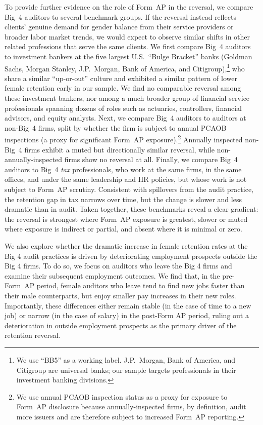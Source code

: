 \documentclass[11pt]{article}
\begin{document}
    To provide further evidence on the role of Form~AP in the reversal, we compare Big~4 auditors to several benchmark groups. If the reversal instead reflects clients' genuine demand for gender balance from their service providers or broader labor market trends, we would expect to observe similar shifts in other related professions that serve the same clients. We first compare Big~4 auditors to investment bankers at the five largest U.S.\ ``Bulge Bracket'' banks (Goldman Sachs, Morgan Stanley, J.P.\ Morgan, Bank of America, and Citigroup),\footnote{We use ``BB5'' as a working label. J.P.\ Morgan, Bank of America, and Citigroup are universal banks; our sample targets professionals in their investment banking divisions.} who share a similar ``up-or-out'' culture and exhibited a similar pattern of lower female retention early in our sample. We find no comparable reversal among these investment bankers, nor among a much broader group of financial service professionals spanning dozens of roles such as actuaries, controllers, financial advisors, and equity analysts. Next, we compare Big~4 auditors to auditors at non-Big~4 firms, split by whether the firm is subject to annual PCAOB inspections (a proxy for significant Form~AP exposure).\footnote{We use annual PCAOB inspection status as a proxy for exposure to Form~AP disclosure because annually-inspected firms, by definition, audit more issuers and are therefore subject to increased Form~AP reporting.} Annually inspected non-Big~4 firms exhibit a muted but directionally similar reversal, while non-annually-inspected firms show no reversal at all. Finally, we compare Big~4 auditors to Big~4 \textit{tax} professionals, who work at the same firms, in the same offices, and under the same leadership and HR policies, but whose work is not subject to Form~AP scrutiny. Consistent with spillovers from the audit practice, the retention gap in tax narrows over time, but the change is slower and less dramatic than in audit. Taken together, these benchmarks reveal a clear gradient: the reversal is strongest where Form~AP exposure is greatest, slower or muted where exposure is indirect or partial, and absent where it is minimal or zero. 
    
    We also explore whether the dramatic increase in female retention rates at the Big 4 audit practices is driven by deteriorating employment prospects outside the Big 4 firms. To do so, we focus on auditors who leave the Big 4 firms and examine their subsequent employment outcomes. We find that, in the pre-Form~AP period, female auditors who leave tend to find new jobs faster than their male counterparts, but enjoy smaller pay increases in their new roles. Importantly, these differences either remain stable (in the case of time to a new job) or narrow (in the case of salary) in the post-Form AP period, ruling out a deterioration in outside employment prospects as the primary driver of the retention reversal.
\end{document}
